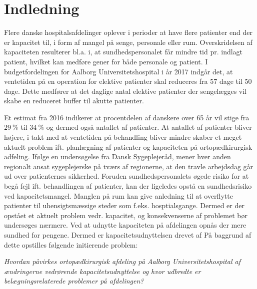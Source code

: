 \chapter{Indledning}


Flere danske hospitalsafdelinger oplever i perioder at have flere patienter end der er kapacitet til, i form af mangel på senge, personale eller rum\cite{Company2013}. Overskridelsen af kapaciteten resulterer bl.a. i, at sundhedspersonalet får mindre tid pr. indlagt patient, hvilket kan medføre gener for både personale og patient.\cite{Kjeldsen2015} I budgetfordelingen for Aalborg Universitetshospital i år 2017 indgår det, at ventetiden på en operation for elektive patienter skal reduceres fra 57 dage til 50 dage\cite{Budget2016}. Dette medfører at det daglige antal elektive patienter der sengelægges vil skabe en reduceret buffer til akutte patienter. 

Et estimat fra 2016 indikerer at procentdelen af danskere over 65 år vil stige fra $29~\%$ til $34~\%$ og dermed også antallet af patienter\cite{RegionNord2016}. At antallet af patienter bliver højere, i takt med at ventetiden på behandling bliver mindre skaber et meget aktuelt problem ift. planlægning af patienter og kapaciteten på ortopædkirurgisk adfeling. 
Ifølge en undersøgelse fra Dansk Sygeplejeråd, mener hver anden regionalt ansat sygeplejerske på tværs af regionerne, at den travle arbejdsdag går ud over patienternes sikkerhed\cite{Kjeldsen2015}. Foruden sundhedspersonalets øgede risiko for at begå fejl ift. behandlingen af patienter, kan der ligeledes opstå en sundhedsrisiko ved kapacitetsmangel. Manglen på rum kan give anledning til at overflytte patienter til uhensigtsmæssige steder som f.eks. hosptialsgange\cite{Madsen2014}. Dermed er der opstået et aktuelt problem vedr. kapacitet, og konsekvenserne af problemet bør undersøges nærmere. Ved at udnytte kapaciteten på afdelingen opnås der mere sundhed for pengene\cite{Company2013}. Dermed er kapacitetsudnyttelsen drevet af  På baggrund af dette opstilles følgende initierende problem:

\textit{Hvordan påvirkes ortopædkirurgisk afdeling på Aalborg Universitetshospital af ændringerne vedrørende kapacitetsudnyttelse og hvor udbredte er belægningsrelaterede problemer på afdelingen?}






